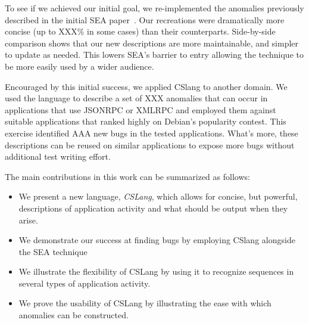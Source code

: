 To see if we achieved our initial goal, we re-implemented the
anomalies previously described in the initial SEA paper~\cite{crashsim}.
Our recreations were dramatically more concise (up to XXX\% in some cases)
than their counterparts.  Side-by-side comparison shows that our new
descriptions are
more maintainable,
and simpler to update as needed.
This lowers SEA's barrier to entry allowing the
technique to be more easily used by a wider audience.


Encouraged by this initial success,
we applied CSlang to another domain.
We used the language to describe a set of XXX anomalies that can occur in
applications that use JSONRPC or XMLRPC and employed them against
suitable
applications that ranked highly on Debian's popularity contest.  This
exercise identified AAA new bugs in the tested applications.
What's more, these descriptions can be reused on
similar applications to expose more
bugs without additional test writing effort.

The main contributions in this work can be summarized as follows:

\begin{itemize}

\item{We present a new language, {\em CSLang},
  which allows for concise, but powerful, descriptions of
    application activity and what should be output when they arise.}


\item{We demonstrate our success at finding bugs by employing CSlang
  alongside the SEA technique}

\item{We illustrate the flexibility of CSLang by using it to recognize
  sequences in several types of application activity.}

\item{We prove the usability of CSLang by illustrating the ease with which
  anomalies can be constructed.}


\end{itemize}

